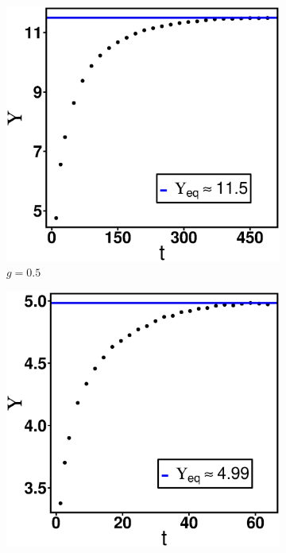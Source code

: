 \documentclass[../../main.tex]{subfiles}
\begin{document}
        \begin{figure}[h]
            \centering
            \begin{subfigure}[b]{0.328\textwidth}
                \centering
                \includegraphics[width=\textwidth]{Figures/lj_halfg.eps}
                \caption{$g = 0.5$}
                \label{fig: LJ - half g}
            \end{subfigure}
            \hfill
            \begin{subfigure}[b]{0.328\textwidth}
                \centering
                \includegraphics[width=\textwidth]{Figures/lj_oneg.eps}

\end{subfigure}
\end{figure}
\end{document}

